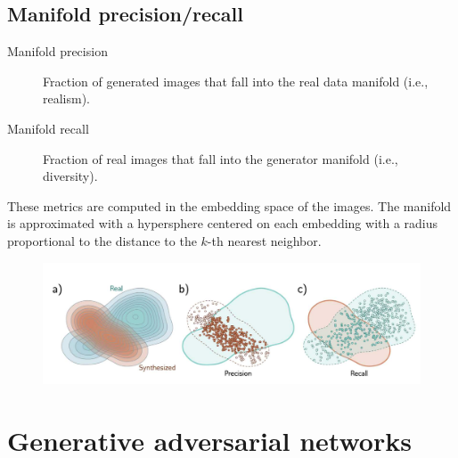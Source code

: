 \subsection{Manifold precision/recall}

\begin{description}
    \item[Manifold precision] 
        Fraction of generated images that fall into the real data manifold (i.e., realism).

    \item[Manifold recall] 
        Fraction of real images that fall into the generator manifold (i.e., diversity).
\end{description}

\begin{remark}
    These metrics are computed in the embedding space of the images. The manifold is approximated with a hypersphere centered on each embedding with a radius proportional to the distance to the $k$-th nearest neighbor.
\end{remark}

\begin{figure}[H]
    \centering
    \includegraphics[width=0.8\linewidth]{./img/manifold_precision_recall.jpg}
\end{figure}



\section{Generative adversarial networks}



